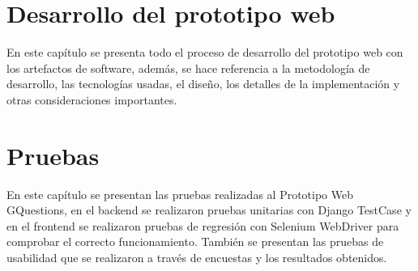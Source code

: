 \documentclass[spanish, a4paper, 12pt, twoside, openany]{book}
\numberwithin{equation}{section} %
\begin{document}





\clearpage

\chapter{Desarrollo del prototipo web}

\begin{justify}
En este capítulo se presenta todo el proceso de desarrollo del prototipo web con los artefactos de software, además, se hace referencia a la metodología de desarrollo, las tecnologías usadas, el diseño, los detalles de la implementación y otras consideraciones importantes.  
\end{justify}






\clearpage

\chapter{Pruebas}
\begin{justify}
En este capítulo se presentan las pruebas realizadas al Prototipo Web GQuestions, en el backend se realizaron pruebas unitarias con Django TestCase y en el frontend se realizaron pruebas de regresión con Selenium WebDriver para comprobar el correcto funcionamiento. También se presentan las pruebas de usabilidad que se realizaron a través de encuestas y los resultados obtenidos.
\end{justify}







\clearpage
\end{document}
